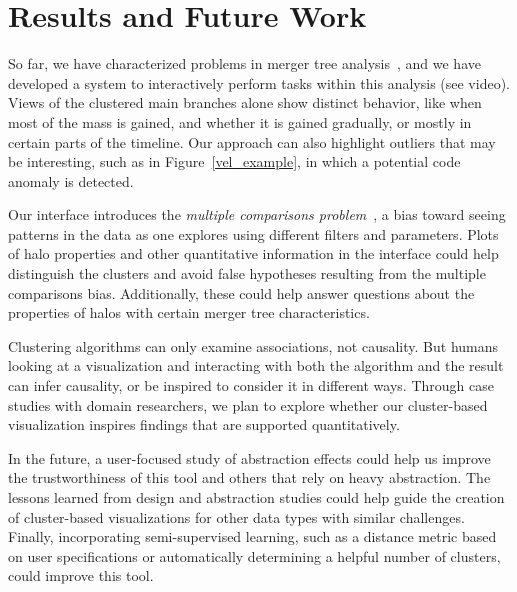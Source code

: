 \section{Results and Future Work}

So far, we have characterized problems in merger tree analysis~\cite{trenches_stacks}, and we have developed a system to interactively perform tasks within this analysis (see video). Views of the clustered main branches alone show distinct behavior, like when most of the mass is gained, and whether it is gained gradually, or mostly in certain parts of the timeline. Our approach can also highlight outliers that may be interesting, such as in Figure~\ref{vel_example}, in which a potential code anomaly is detected. 

Our interface introduces the \textit{multiple comparisons problem}~\cite{m_c_p}, a bias toward seeing patterns in the data as one explores using different filters and parameters. Plots of halo properties and other quantitative information in the interface could help distinguish the clusters and avoid false hypotheses resulting from the multiple comparisons bias. Additionally, these could help answer questions about the properties of halos with certain merger tree characteristics.


Clustering algorithms can only examine associations, not causality. But humans looking at a visualization and interacting with both the algorithm and the result can infer causality, or be inspired to consider it in different ways. Through case studies with domain researchers, we plan to explore whether our cluster-based visualization inspires findings that are supported quantitatively.

In the future, a user-focused study of abstraction effects could help us improve the trustworthiness of this tool and others that rely on heavy abstraction. The lessons learned from design and abstraction studies could help guide the creation of cluster-based visualizations for other data types with similar challenges. Finally, incorporating semi-supervised learning, such as a distance metric based on user specifications or automatically determining a helpful number of clusters, could improve this tool.


